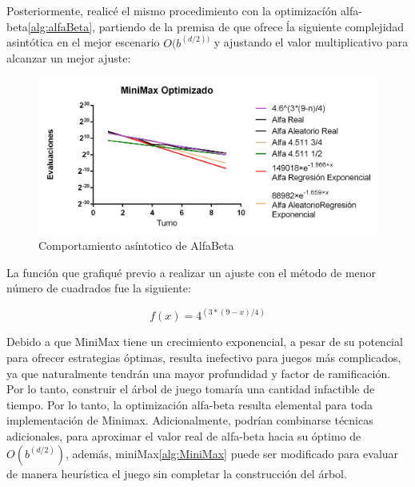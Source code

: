 Posteriormente, realicé el mismo procedimiento con la optimizacíón alfa-beta\ref{alg:alfaBeta}, partiendo de la premisa de que ofrece ĺa siguiente complejidad asintótica en el mejor escenario $O(b^{(d/2))}$\autocite{bruce_cs_} y ajustando el valor multiplicativo para alcanzar un mejor ajuste: 
\begin{figure}[H]
\centering
\includegraphics[scale=.60]{Graphs/Alfas.png}
\caption{Comportamiento asíntotico de AlfaBeta}\label{graf2}
\end{figure}

La función que grafiqué previo a realizar un ajuste con el método de menor número de cuadrados fue  la siguiente:

\begin{equation}
f(x) = 4^{(3*(9-x)/4)}
\end{equation}

Debido a que MiniMax tiene un crecimiento exponencial, a pesar de su potencial para ofrecer estrategias óptimas, resulta inefectivo para juegos más complicados, ya que naturalmente tendrán una mayor profundidad y factor de ramificación. Por lo tanto, construir el árbol de juego tomaría una cantidad infactible de tiempo. Por lo tanto, la optimización alfa-beta resulta elemental para toda implementación de Minimax. Adicionalmente, podrían combinarse técnicas adicionales, para aproximar el valor real de alfa-beta hacia su óptimo de $O(b^{(d/2)})$, además, miniMax\ref{alg:MiniMax} puede ser modificado para evaluar de manera heurística el juego sin completar la construcción del árbol.